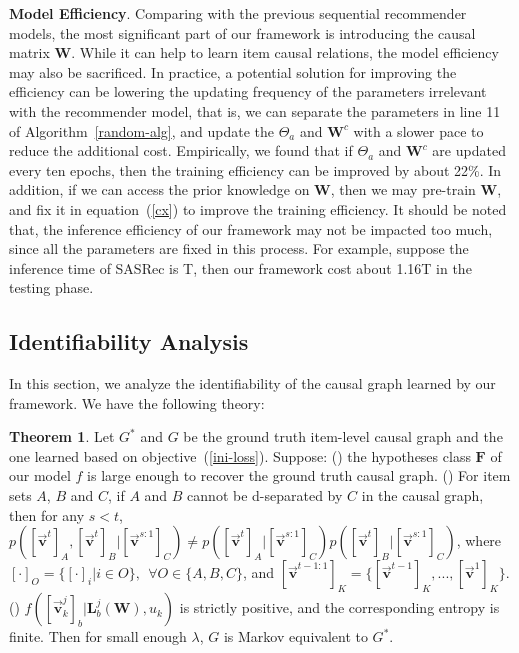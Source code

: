 \documentclass[conference]{IEEEtran}
\theoremstyle{definition}
\theoremstyle{theorem}
\newtheorem{mytheory}{Theorem}
\theoremstyle{proof}
\theoremstyle{remark}
\begin{document}
{
\textbf{Model Efficiency}.
Comparing with the previous sequential recommender models, the most significant part of our framework is introducing the causal matrix $\bm{W}$.
While it can help to learn item causal relations, the model efficiency may also be sacrificed.
In practice, a potential solution for improving the efficiency can be lowering the updating frequency of the parameters irrelevant with the recommender model, that is, we can separate the parameters in line 11 of Algorithm~\ref{random-alg}, and update the $\Theta_{a}$ and $\bm{W}^c$ with a slower pace to reduce the additional cost.
Empirically, we found that if $\Theta_{a}$ and $\bm{W}^c$ are updated every ten epochs, then the training efficiency can be improved by about 22\%. 
In addition, if we can access the prior knowledge on $\bm{{W}}$, then we may pre-train $\bm{{W}}$, and fix it in equation~(\ref{cx}) to improve the training efficiency.
It should be noted that, the inference efficiency of our framework may not be impacted too much, since all the parameters are fixed in this process.
For example, suppose the inference time of SASRec is T, then our framework cost about 1.16T in the testing phase. 
}


\subsection{Identifiability Analysis}
In this section, we analyze the identifiability of the causal graph learned by our framework.
We have the following theory:
\begin{mytheory}
	Let $G^*$ and ${G}$ be the ground truth item-level causal graph and the one learned based on objective~(\ref{ini-loss}).
	Suppose: 
	() {the hypotheses class $\bm{F}$ of our model $f$ is large enough to recover the ground truth causal graph.}
	() For item sets $A$, $B$ and $C$, if $A$ and $B$ cannot be d-separated by $C$ in the causal graph, then for any $s<t$, $p([\vec{\bm{v}}^t]_A,[\vec{\bm{v}}^t]_B|[\vec{\bm{v}}^{s:1}]_C)\neq p([\vec{\bm{v}}^t]_A|[\vec{\bm{v}}^{s:1}]_C)p([\vec{\bm{v}}^t]_B|[\vec{\bm{v}}^{s:1}]_C)$,
	where $[\cdot]_{O} = \{[\cdot]_i|i\in O\},~~\forall O\in \{A,B,C\}$, and $[\vec{\bm{v}}^{t-1:1}]_K = \{[\vec{\bm{v}}^{t-1}]_K,...,[\vec{\bm{v}}^1]_K\}$.
	() {$f([\vec{\bm{v}}_{k}^{j}]_b|\bm{L}_b^j(\bm{W}), {u_k})$ is strictly positive, and the corresponding entropy is finite. }
	Then for small enough $\lambda$, ${G}$ is Markov equivalent to $G^*$.
\end{mytheory}
\end{document}
